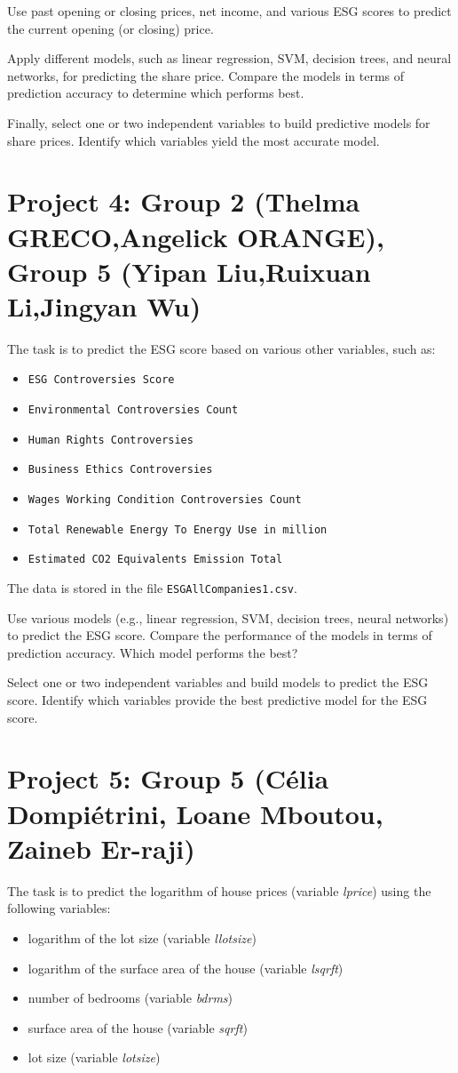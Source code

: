 \documentclass{article}
\begin{document}
Use past opening or closing prices, net income, and various ESG scores to predict the current opening (or closing) price.

Apply different models, such as linear regression, SVM, decision trees, and neural networks, for predicting the share price. Compare the models in terms of prediction accuracy to determine which performs best.

Finally, select one or two independent variables to build predictive models for share prices. Identify which variables yield the most accurate model. 



 \section*{Project 4:  Group 2 (Thelma GRECO,Angelick ORANGE), Group  5 (Yipan Liu,Ruixuan Li,Jingyan Wu) }
The task is to predict the ESG score based on various other variables, such as: \begin{itemize} \item \lstinline$ESG Controversies Score$ \item \lstinline$Environmental Controversies Count$ \item \lstinline$Human Rights Controversies$ \item \lstinline$Business Ethics Controversies$ \item \lstinline$Wages Working Condition Controversies Count$ \item \lstinline$Total Renewable Energy To Energy Use in million$ \item \lstinline$Estimated CO2 Equivalents Emission Total$ \end{itemize}

The data is stored in the file \lstinline$ESGAllCompanies1.csv$.

Use various models (e.g., linear regression, SVM, decision trees, neural networks) to predict the ESG score. Compare the performance of the models in terms of prediction accuracy. Which model performs the best?

Select one or two independent variables and build models to predict the ESG score. Identify which variables provide the best predictive model for the ESG score. 

\section*{Project 5: Group 5 (Célia Dompiétrini, Loane Mboutou,  Zaineb Er-raji)}
The task is to predict the logarithm of house prices (variable \emph{lprice}) using the following variables: \begin{itemize} \item logarithm of the lot size (variable \emph{llotsize}) \item logarithm of the surface area of the house (variable \emph{lsqrft}) \item number of bedrooms (variable \emph{bdrms}) \item surface area of the house (variable \emph{sqrft}) \item lot size (variable \emph{lotsize}) \end{itemize}
\end{document}
